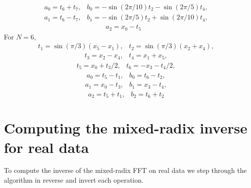 \documentclass[fleqn,12pt]{article}
\begin{document}
\begin{equation}
\begin{array}{ll}
a_0 = t_6 + t_7, & b_0 = -\sin(2\pi/10) t_2 - \sin(2\pi/5) t_4, 
\end{array}
\end{equation}
\begin{equation}
\begin{array}{ll}
a_1 = t_6 - t_7, & b_1 = -\sin(2\pi/5) t_2 + \sin(2\pi/10) t_4,
\end{array}
\end{equation}
\begin{equation}
\begin{array}{ll}
a_2 = x_0 - t_5 &
\end{array}
\end{equation}
%
For $N=6$,
%
\begin{equation}
\begin{array}{ll}
t_1 = \sin(\pi/3)(x_5 - x_1), & t_2 = \sin(\pi/3) (x_2 + x_4),
\end{array}
\end{equation}
\begin{equation}
\begin{array}{ll}
t_3 = x_2 - x_4, & t_4 = x_1 + x_5,
\end{array}
\end{equation}
\begin{equation}
\begin{array}{ll}
t_5 = x_0 + t_3 / 2, & t_6 = -x_3 - t_4 / 2,
\end{array}
\end{equation}
\begin{equation}
\begin{array}{ll}
a_0 = t_5 - t_1, & b_0 = t_6 - t_2,
\end{array}
\end{equation}
\begin{equation}
\begin{array}{ll}
a_1 = x_0 - t_3, & b_1 = x_3 - t_4,
\end{array}
\end{equation}
\begin{equation}
\begin{array}{ll}
a_2 = t_5 + t_1, & b_2 = t_6 + t_2
\end{array}
\end{equation}

\section{Computing the mixed-radix inverse for real data}
%
To compute the inverse of the mixed-radix FFT on real data we step
through the algorithm in reverse and invert each operation.
\end{document}
